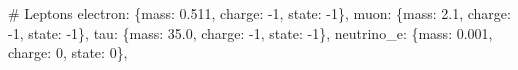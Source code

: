 \documentclass[
  11pt,
  letterpaper,
  twoside,
  openright]{book}
\newenvironment{Shaded}{\begin{snugshade}}{\end{snugshade}}
\newcommand{\CommentTok}[1]{\textcolor[rgb]{0.37,0.37,0.37}{#1}}
\newcommand{\DecValTok}[1]{\textcolor[rgb]{0.68,0.00,0.00}{#1}}
\newcommand{\FloatTok}[1]{\textcolor[rgb]{0.68,0.00,0.00}{#1}}
\newcommand{\NormalTok}[1]{\textcolor[rgb]{0.00,0.23,0.31}{#1}}
\newcommand{\OperatorTok}[1]{\textcolor[rgb]{0.37,0.37,0.37}{#1}}
\newcommand{\StringTok}[1]{\textcolor[rgb]{0.13,0.47,0.30}{#1}}
\begin{document}
\begin{Shaded}
\begin{Highlighting}[]
    \CommentTok{\# Leptons}
    \StringTok{\textquotesingle{}electron\textquotesingle{}}\NormalTok{: \{}\StringTok{\textquotesingle{}mass\textquotesingle{}}\NormalTok{: }\FloatTok{0.511}\NormalTok{, }\StringTok{\textquotesingle{}charge\textquotesingle{}}\NormalTok{: }\OperatorTok{{-}}\DecValTok{1}\NormalTok{, }\StringTok{\textquotesingle{}state\textquotesingle{}}\NormalTok{: }\OperatorTok{{-}}\DecValTok{1}\NormalTok{\},}
    \StringTok{\textquotesingle{}muon\textquotesingle{}}\NormalTok{: \{}\StringTok{\textquotesingle{}mass\textquotesingle{}}\NormalTok{: }\FloatTok{2.1}\NormalTok{, }\StringTok{\textquotesingle{}charge\textquotesingle{}}\NormalTok{: }\OperatorTok{{-}}\DecValTok{1}\NormalTok{, }\StringTok{\textquotesingle{}state\textquotesingle{}}\NormalTok{: }\OperatorTok{{-}}\DecValTok{1}\NormalTok{\},}
    \StringTok{\textquotesingle{}tau\textquotesingle{}}\NormalTok{: \{}\StringTok{\textquotesingle{}mass\textquotesingle{}}\NormalTok{: }\FloatTok{35.0}\NormalTok{, }\StringTok{\textquotesingle{}charge\textquotesingle{}}\NormalTok{: }\OperatorTok{{-}}\DecValTok{1}\NormalTok{, }\StringTok{\textquotesingle{}state\textquotesingle{}}\NormalTok{: }\OperatorTok{{-}}\DecValTok{1}\NormalTok{\},}
    \StringTok{\textquotesingle{}neutrino\_e\textquotesingle{}}\NormalTok{: \{}\StringTok{\textquotesingle{}mass\textquotesingle{}}\NormalTok{: }\FloatTok{0.001}\NormalTok{, }\StringTok{\textquotesingle{}charge\textquotesingle{}}\NormalTok{: }\DecValTok{0}\NormalTok{, }\StringTok{\textquotesingle{}state\textquotesingle{}}\NormalTok{: }\DecValTok{0}\NormalTok{\},}


\end{Highlighting}
\end{Shaded}
\end{document}
